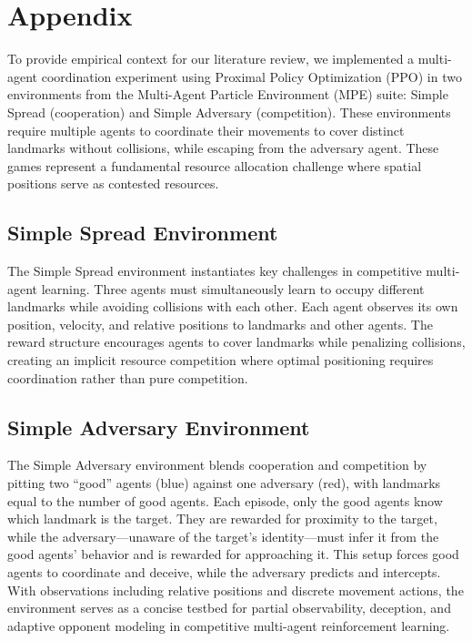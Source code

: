 \appendix

\section{Appendix}\label{app}

To provide empirical context for our literature review, we implemented a multi-agent coordination experiment using Proximal Policy Optimization (PPO) in two environments from the Multi-Agent Particle Environment (MPE) suite: Simple Spread (cooperation) and Simple Adversary (competition). These environments require multiple agents to coordinate their movements to cover distinct landmarks without collisions, while escaping from the adversary agent. These games represent a fundamental resource allocation challenge where spatial positions serve as contested resources.

\subsection{Simple Spread Environment}

The Simple Spread environment instantiates key challenges in competitive multi-agent learning. Three agents must simultaneously learn to occupy different landmarks while avoiding collisions with each other. Each agent observes its own position, velocity, and relative positions to landmarks and other agents. The reward structure encourages agents to cover landmarks while penalizing collisions, creating an implicit resource competition where optimal positioning requires coordination rather than pure competition.

\subsection{Simple Adversary Environment}

The Simple Adversary environment blends cooperation and competition by pitting two “good” agents (blue) against one adversary (red), with landmarks equal to the number of good agents. Each episode, only the good agents know which landmark is the target. They are rewarded for proximity to the target, while the adversary—unaware of the target’s identity—must infer it from the good agents’ behavior and is rewarded for approaching it. This setup forces good agents to coordinate and deceive, while the adversary predicts and intercepts. With observations including relative positions and discrete movement actions, the environment serves as a concise testbed for partial observability, deception, and adaptive opponent modeling in competitive multi-agent reinforcement learning.

